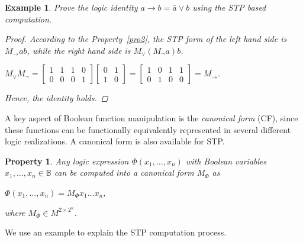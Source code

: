 \documentclass[conference]{IEEEtran}
\newtheorem{ownproperty}{Property} 			%
\newtheorem{ownexample}{Example} 			%
\begin{document}
\begin{ownexample}
Prove the logic identity $a \rightarrow b = \bar{a} \lor b$ using the STP based computation.
\begin{proof}
According to the Property~\ref{pro2}, the STP form of the left hand side is $M_{\rightarrow} ab$, while the right hand side is $M_{\lor} (M_\lnot a)b$.
\begin{center}
$M_{\lor} M_\lnot = \begin{bmatrix} 1&1&1&0 \\ 0&0&0&1 \end{bmatrix} \begin{bmatrix} 0&1 \\ 1&0 \end{bmatrix} = \begin{bmatrix} 1&0&1&1 \\ 0&1&0&0 \end{bmatrix} = M_{\rightarrow}$.
\end{center}
Hence, the identity holds.
\end{proof}
\end{ownexample}

A key aspect of Boolean function manipulation is the \emph{canonical form} (CF), since these functions can be functionally equivalently represented in several different logic realizations. A canonical form is also available for STP.

\begin{ownproperty}
\label{pro3}
Any logic expression $\Phi(x_1, \ldots, x_n)$ with Boolean variables $x_1, \ldots, x_n \in \mathbb{B} $ can be computed into a canonical form $M_{\Phi}$ as
\begin{center}
$ \Phi(x_1, \ldots, x_n) = M_{\Phi} x_1 \ldots x_n$,
\end{center}
where $M_{\Phi} \in  M^{2 \times 2^n}$.
\end{ownproperty}

We use an example to explain the STP computation process.
\end{document}
